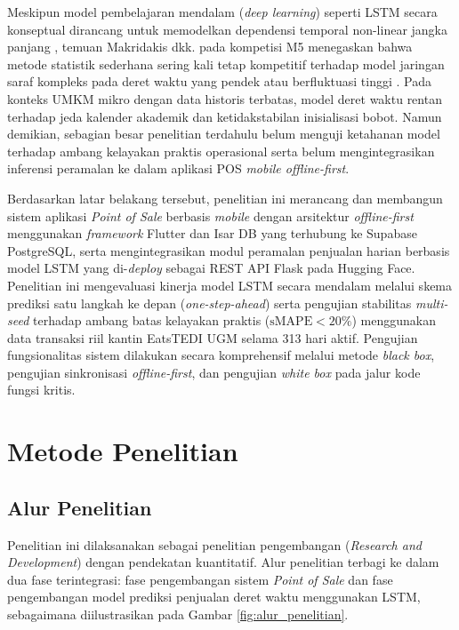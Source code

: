 \documentclass[10pt,a4paper]{article}
\begin{document}
Meskipun model pembelajaran mendalam (\textit{deep learning}) seperti LSTM secara konseptual dirancang untuk memodelkan dependensi temporal non-linear jangka panjang \cite{hochreiter1997, goodfellow2016deep}, temuan Makridakis dkk. pada kompetisi M5 menegaskan bahwa metode statistik sederhana sering kali tetap kompetitif terhadap model jaringan saraf kompleks pada deret waktu yang pendek atau berfluktuasi tinggi \cite{makridakis2022}. Pada konteks UMKM mikro dengan data historis terbatas, model deret waktu rentan terhadap jeda kalender akademik dan ketidakstabilan inisialisasi bobot. Namun demikian, sebagian besar penelitian terdahulu belum menguji ketahanan model terhadap ambang kelayakan praktis operasional serta belum mengintegrasikan inferensi peramalan ke dalam aplikasi POS \textit{mobile offline-first}.

Berdasarkan latar belakang tersebut, penelitian ini merancang dan membangun sistem aplikasi \textit{Point of Sale} berbasis \textit{mobile} dengan arsitektur \textit{offline-first} menggunakan \textit{framework} Flutter dan Isar DB yang terhubung ke Supabase PostgreSQL, serta mengintegrasikan modul peramalan penjualan harian berbasis model LSTM yang di-\textit{deploy} sebagai REST API Flask pada Hugging Face. Penelitian ini mengevaluasi kinerja model LSTM secara mendalam melalui skema prediksi satu langkah ke depan (\textit{one-step-ahead}) serta pengujian stabilitas \textit{multi-seed} terhadap ambang batas kelayakan praktis ($\text{sMAPE} < 20\%$) menggunakan data transaksi riil kantin EatsTEDI UGM selama 313 hari aktif. Pengujian fungsionalitas sistem dilakukan secara komprehensif melalui metode \textit{black box}, pengujian sinkronisasi \textit{offline-first}, dan pengujian \textit{white box} pada jalur kode fungsi kritis.

\section{Metode Penelitian}

\subsection{Alur Penelitian}
Penelitian ini dilaksanakan sebagai penelitian pengembangan (\textit{Research and Development}) dengan pendekatan kuantitatif. Alur penelitian terbagi ke dalam dua fase terintegrasi: fase pengembangan sistem \textit{Point of Sale} dan fase pengembangan model prediksi penjualan deret waktu menggunakan LSTM, sebagaimana diilustrasikan pada Gambar \ref{fig:alur_penelitian}.
\end{document}
